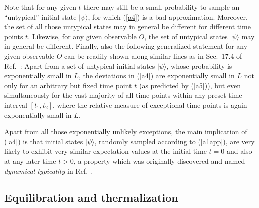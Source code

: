 \documentclass[twocolumn,aps,prb,floatfix,superscriptaddress]{revtex4-2}
\newcommand{\<}{\left\langle}	%
\renewcommand{\>}{\right\rangle}	%
\begin{document}
Note that for any given $t$ there may still be
a small probability to sample an ``untypical'' 
initial state $|\psi \rangle$, for which  
(\ref{a4}) is a bad approximation.
Moreover, the set of all those untypical states 
may in general be different for different time points $t$.
Likewise, for any given observable $O$, the
set of untypical states $|\psi \rangle$ 
may in general be different.
Finally, also the following generalized
statement for any given observable $O$
can be readily shown along similar lines as  
in Sec.~17.4 of Ref.~\cite{bal19}:
Apart from a set of untypical initial states $|\psi\rangle$, 
whose probability is exponentially small in $L$,
the deviations in (\ref{a4}) are exponentially 
small in $L$ not only for an arbitrary but fixed
time point $t$ (as predicted by (\ref{a5})),
but even simultaneously for the vast majority of all time 
points within any preset time interval $[t_1,t_2]$,
where the relative measure of exceptional
time points is again exponentially small in $L$.

Apart from all those exponentially unlikely
exceptions, the main implication of
(\ref{a4}) is that initial states 
$|\psi \rangle$, randomly sampled according 
to (\ref{a1app}), are very likely to exhibit very 
similar expectation values 
at the initial time $t=0$ and also
at any later time $t>0$, a property which 
was originally discovered and 
named {\em dynamical typicality}
in Ref. \cite{bar09}.

\subsection{Equilibration and thermalization}
\label{app112}
\end{document}

